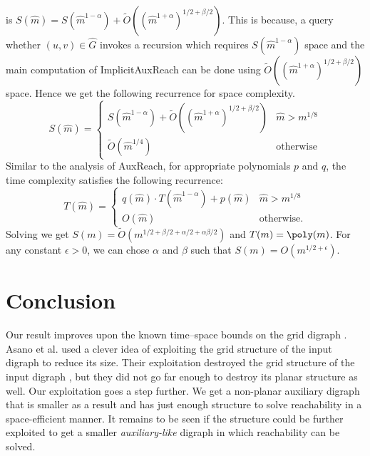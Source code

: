 \documentclass{toc}
\begin{document}
%
is   %
$S(\widehat{m}) = S(\widehat{m}^{1-\alpha}) + \widetilde{O}((\widehat{m}^{1+\alpha})^{1/2 + \beta/2})$. This is because, a query whether $(u,v) \in \widehat{G}$%
invokes  %
a recursion which %
requires  %
$S(\widehat{m}^{1-\alpha})$ space and the main computation of \textsf{ImplicitAuxReach} %
can  %
be done using $\widetilde{O}((\widehat{m}^{1+\alpha})^{1/2 + \beta/2})$ space. Hence we get the following recurrence for space complexity.
\[S(\widehat{m}) =
\begin{cases}
S(\widehat{m}^{1 - \alpha}) + \widetilde{O}((\widehat{m}^{1+\alpha})^{1/2 + \beta/2}) & \widehat{m} > m^{1/8} \\
\widetilde{O}(\widehat{m}^{1/4}) & \textrm{otherwise}
\end{cases}\]
Similar to the analysis of \textsf{AuxReach}, for appropriate polynomials $p$ and $q$, the time complexity %
satisfies  %
the following recurrence:
\[T(\widehat{m}) = \begin{cases}
q (\widehat{m}) \cdot T(\widehat{m}^{1 - \alpha}) + p(\widehat{m}) & \widehat{m} > m^{1/8} \\
O(\widehat{m}) & \textrm{otherwise}.
\end{cases}\]
Solving we get $S(m) = \widetilde{O}(m^{1/2 + \beta/2 + \alpha/2 + \alpha\beta/2})$ and $T(m) = \poly(m)$. For any constant $\epsilon>0$, we can chose $\alpha$ and $\beta$ such that $S(m) = {O}(m^{1/2 + \epsilon})$.

\section{Conclusion}
Our result improves upon the known time--space bounds on the grid %
digraph %
. Asano et al. \cite{Asano} used a clever idea of exploiting the grid structure of the input %
digraph %
to reduce its size. Their exploitation destroyed the grid structure of the input
digraph %
, but they did not go far enough to destroy its planar structure as well. Our exploitation goes a step further. We get a non-planar auxiliary %
digraph %
 that is smaller as a result and has just enough structure to solve reachability in a space-efficient manner. It remains to be seen if the structure could be further exploited to get a smaller \emph{auxiliary-like} %
digraph %
 in which reachability can be solved.
\end{document}
